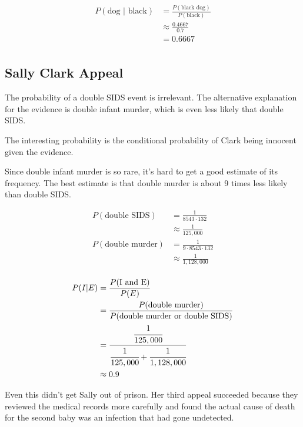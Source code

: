 \documentclass[landscape]{exam}
\begin{document}
  \begin{align*}
    P(\text{dog } | \text{ black}) & = \frac{P(\text{black dog})}{P(\text{black})} \\
                                   & \approx \frac{0.4667}{0.7} \\
                                   & = 0.6667 \\
  \end{align*}

  \subsection{Sally Clark Appeal}
  The probability of a double SIDS event is irrelevant. The alternative
  explanation for the evidence is double infant murder, which is even less
  likely that double SIDS. 
  
  The interesting probability is the conditional probability of Clark being
  innocent given the evidence.

  Since double infant murder is so rare, it's hard to get a good estimate of its
  frequency. The best estimate is that double murder is about 9 times less
  likely than double SIDS.

  \begin{align*}
    P(\text{double SIDS}) & = \frac{1}{8543 \cdot 132} \\
                            & \approx \frac{1}{125,000} \\
    P(\text{double murder}) & = \frac{1}{9 \cdot 8543 \cdot 132} \\
                            & \approx \frac{1}{1,128,000} \\
  \end{align*}

  \begin{align*}
    P(I | E) & = \frac{P(\text{I and E})}{P(E)} \\
             & = \frac{P(\text{double murder})}{P(\text{double murder or double SIDS})} \\
             & = \frac{\cfrac{1}{125,000}}{\cfrac{1}{125,000} + \cfrac{1}{1,128,000}} \\
             & \approx 0.9 \\
  \end{align*}

  Even this didn't get Sally out of prison. Her third appeal succeeded because
  they reviewed the medical records more carefully and found the actual cause of
  death for the second baby was an infection that had gone undetected.
\end{document}
